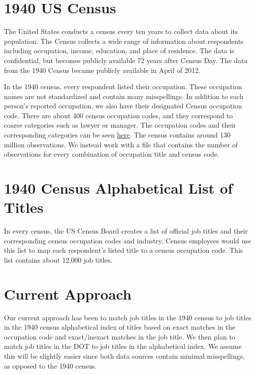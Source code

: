 \documentclass[11pt]{article}
\begin{document}
\FloatBarrier

\section{1940 US Census}

The United States conducts a census every ten years to collect data about its population. The Census collects a wide range of information about respondents including occupation, income, education, and place of residence. The data is confidential, but becomes publicly available 72 years after Census Day. The data from the 1940 Census became publicly available in April of 2012.

In the 1940 census, every respondent listed their occupation. These occupation names are not standardized and contain many misspellings. In addition to each person's reported occupation, we also have their designated Census occupation code. There are about 400 census occupation codes, and they correspond to coarse categories such as lawyer or manager. The occupation codes and their corresponding categories can be seen \href{https://usa.ipums.org/usa/volii/occ1940.shtml}{here}. The census contains around 130 million observations. We instead work with a file that contains the number of observations for every combination of occupation title and census code.

\section{1940 Census Alphabetical List of Titles}

In every census, the US Census Board creates a list of official job titles and their corresponding census occupation codes and industry. Census employees would use this list to map each respondent's listed title to a census occupation code. This list contains about 12,000 job titles.

\section{Current Approach}

Our current approach has been to match job titles in the 1940 census to job titles in the 1940 census alphabetical index of titles based on exact matches in the occupation code and exact/inexact matches in the job title. We then plan to match job titles in the DOT to job titles in the alphabetical index. We assume this will be slightly easier since both data sources contain minimal misspellings, as opposed to the 1940 census.
\end{document}
